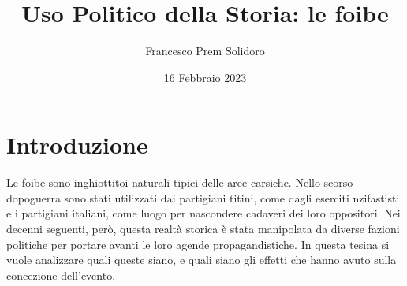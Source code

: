 \documentclass{article}
\title{Uso Politico della Storia: le foibe}
\author{Francesco Prem Solidoro}
\date{16 Febbraio 2023}
\begin{document}
\maketitle
\section{Introduzione} %
\label{sec:Introduzione}
Le foibe sono inghiottitoi naturali tipici delle aree carsiche. Nello scorso dopoguerra sono stati utilizzati dai partigiani titini, come dagli eserciti nzifastisti e i partigiani italiani, come luogo per nascondere cadaveri dei loro oppositori. Nei decenni seguenti, però, questa realtà storica è stata manipolata da diverse fazioni politiche per portare avanti le loro agende propagandistiche. In questa tesina si vuole analizzare quali queste siano, e quali siano gli effetti che hanno avuto sulla concezione dell'evento.
  
\end{document}
